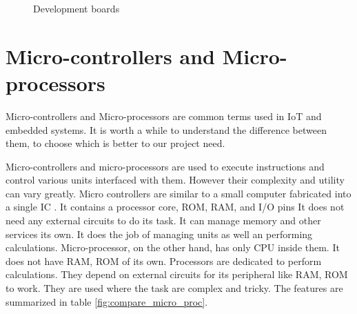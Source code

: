 \begin{figure}
    \centering
    \caption{Development boards}
\end{figure}

\section{Micro-controllers and Micro-processors}
\par Micro-controllers and Micro-processors are common terms used in \ac{IoT} and embedded systems. It is worth a while to understand the difference between them, to choose which is better to our project need.
\par Micro-controllers and micro-processors are used to execute instructions and control various units interfaced with them. However their complexity and utility can vary greatly. Micro controllers are similar to a small computer fabricated into a single \ac{IC} . It contains a processor core, ROM, RAM, and I/O pins It does not need any external circuits to do its task. It can manage memory and other services its own. It does the job of managing units as well an performing calculations. Micro-processor, on the other hand, has only CPU inside them. It does not have RAM, ROM of its own. Processors are dedicated to perform calculations. They depend on external circuits for its peripheral like RAM, ROM to work. They are used where the task are complex and tricky. The features are summarized in table \ref{fig:compare_micro_proc}.

